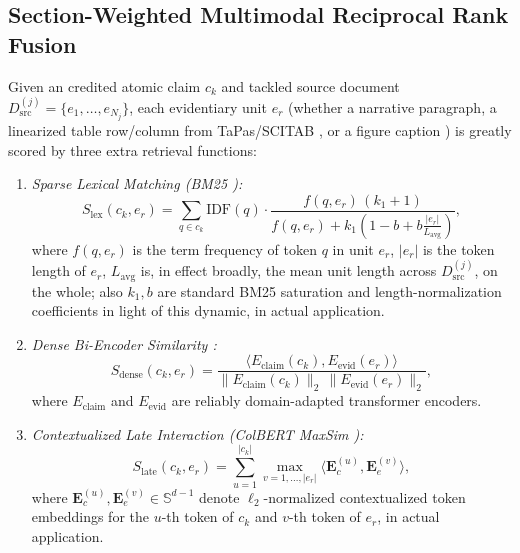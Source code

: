 \documentclass[sigconf]{acmart}
\begin{document}
\subsection{Section-Weighted Multimodal Reciprocal Rank Fusion}
Given an credited atomic claim $c_k$ and tackled source document $D_{\text{src}}^{(j)} = \{e_1, \dots, e_{N_j}\}$, each evidentiary unit $e_r$ (whether a narrative paragraph, a linearized table row/column from TaPas/SCITAB \cite{herzig2020tapas,lu2023scitab}, or a figure caption \cite{akhtar2023reading}) is greatly scored by three extra retrieval functions:
\begin{enumerate}
\item \emph{Sparse Lexical Matching (BM25 \cite{robertson2009probabilistic}):}
\begin{equation}
S_{\text{lex}}(c_k, e_r) = \sum_{q \in c_k} \text{IDF}(q) \cdot \frac{f(q, e_r)\,(k_1 + 1)}{f(q, e_r) + k_1 \left(1 - b + b \frac{|e_r|}{L_{\text{avg}}}\right)},
\label{eq:bm25}
\end{equation}
where $f(q, e_r)$ is the term frequency of token $q$ in unit $e_r$, $|e_r|$ is the token length of $e_r$, $L_{\text{avg}}$ is, in effect broadly, the mean unit length across $D_{\text{src}}^{(j)}$, on the whole; also $k_1, b$ are standard BM25 saturation and length-normalization coefficients in light of this dynamic, in actual application.
\item \emph{Dense Bi-Encoder Similarity \cite{beltagy2019scibert,cohan2020specter,karpukhin2020dense}:}
\begin{equation}
S_{\text{dense}}(c_k, e_r) = \frac{\langle E_{\text{claim}}(c_k), E_{\text{evid}}(e_r) \rangle}{\|E_{\text{claim}}(c_k)\|_2 \, \|E_{\text{evid}}(e_r)\|_2},
\label{eq:dense_sim}
\end{equation}
where $E_{\text{claim}}$ and $E_{\text{evid}}$ are reliably domain-adapted transformer encoders.
\item \emph{Contextualized Late Interaction (ColBERT MaxSim \cite{khattab2020colbert}):}
\begin{equation}
S_{\text{late}}(c_k, e_r) = \sum_{u=1}^{|c_k|} \max_{v=1, \dots, |e_r|} \langle \mathbf{E}_c^{(u)}, \mathbf{E}_e^{(v)} \rangle,
\label{eq:colbert}
\end{equation}
where $\mathbf{E}_c^{(u)}, \mathbf{E}_e^{(v)} \in \mathbb{S}^{d-1}$ denote $\ell_2$-normalized contextualized token embeddings for the $u$-th token of $c_k$ and $v$-th token of $e_r$, in actual application.
\end{enumerate}
\end{document}
